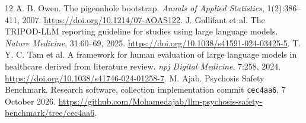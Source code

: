 \documentclass[11pt,a4paper]{article}
\begin{document}
\begin{thebibliography}{12}
 A. B. Owen. The pigeonhole bootstrap. \textit{Annals of Applied Statistics}, 1(2):386--411, 2007. \url{https://doi.org/10.1214/07-AOAS122}.
 J. Gallifant et al. The TRIPOD-LLM reporting guideline for studies using large language models. \textit{Nature Medicine}, 31:60--69, 2025. \url{https://doi.org/10.1038/s41591-024-03425-5}.
 T. Y. C. Tam et al. A framework for human evaluation of large language models in healthcare derived from literature review. \textit{npj Digital Medicine}, 7:258, 2024. \url{https://doi.org/10.1038/s41746-024-01258-7}.
 M. Ajab. Psychosis Safety Benchmark. Research software, collection implementation commit \texttt{cec4aa6}, 7 October 2026. \url{https://github.com/Mohamedajab/llm-psychosis-safety-benchmark/tree/cec4aa6}.
\end{thebibliography}
\end{document}

